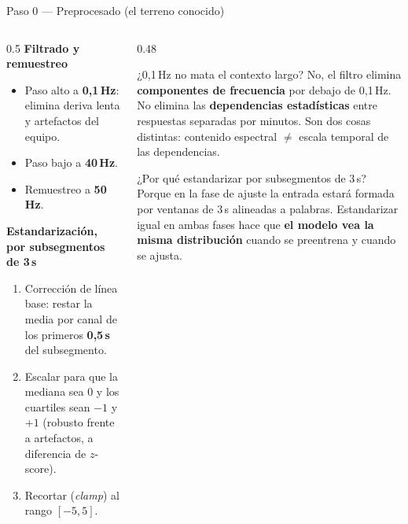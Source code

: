 \documentclass[aspectratio=169,10pt]{beamer}
\newcommand{\term}[1]{\textbf{\color{deepgreen}#1}}
\newcommand{\eng}[1]{{\itshape\color{muted}#1}}
\begin{document}
\begin{frame}[c]{Paso 0 --- Preprocesado (el terreno conocido)}
  \footnotesize
  \begin{columns}[t,totalwidth=\linewidth]
    \begin{column}{0.5\linewidth}
      \textbf{Filtrado y remuestreo}
      \begin{itemize}
        \item Paso alto a \term{0{,}1\,Hz}: elimina deriva lenta y artefactos del equipo.
        \item Paso bajo a \term{40\,Hz}.
        \item Remuestreo a \term{50\,Hz}.
      \end{itemize}
      \vspace{2mm}
      \textbf{Estandarización, por subsegmentos de 3\,s}
      \begin{enumerate}
        \item Corrección de línea base: restar la media por canal de los primeros \term{0{,}5\,s} del subsegmento.
        \item Escalar para que la mediana sea 0 y los cuartiles sean $-1$ y $+1$ (robusto frente a artefactos, a diferencia de $z$-score).
        \item Recortar (\eng{clamp}) al rango $[-5,5]$.
      \end{enumerate}
    \end{column}
    \begin{column}{0.48\linewidth}
      \begin{alertblock}{¿0{,}1\,Hz no mata el contexto largo?}
        No, el filtro elimina \term{componentes de frecuencia} por debajo de 0{,}1\,Hz. No elimina las \term{dependencias estadísticas} entre respuestas separadas por minutos. Son dos cosas distintas: contenido espectral $\neq$ escala temporal de las dependencias.
      \end{alertblock}
      \vspace{2mm}
      \begin{block}{¿Por qué estandarizar por subsegmentos de 3\,s?}
        Porque en la fase de ajuste la entrada estará formada por ventanas de 3\,s alineadas a palabras. Estandarizar igual en ambas fases hace que \term{el modelo vea la misma distribución} cuando se preentrena y cuando se ajusta.
      \end{block}
    \end{column}
  \end{columns}
\end{frame}
\end{document}
